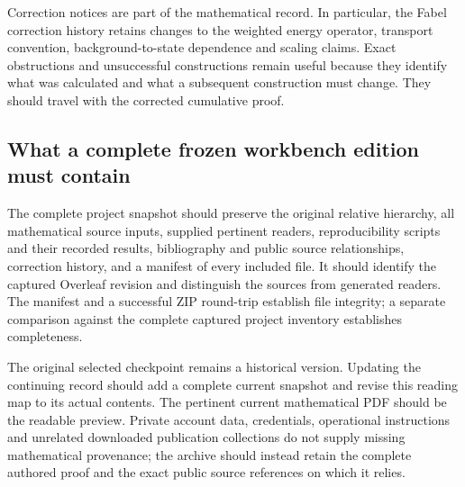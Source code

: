Correction notices are part of the mathematical record. In particular,
the Fabel correction history retains changes to the weighted energy
operator, transport convention, background-to-state dependence and
scaling claims. Exact obstructions and unsuccessful constructions remain
useful because they identify what was calculated and what a subsequent
construction must change. They should travel with the corrected
cumulative proof.

\subsection{What a complete frozen workbench edition must
contain}\label{full-workbench-reading-map-md-what-a-complete-frozen-workbench-edition-must-contain}

The complete project snapshot should preserve the original relative
hierarchy, all mathematical source inputs, supplied pertinent readers,
reproducibility scripts and their recorded results, bibliography and
public source relationships, correction history, and a manifest of every
included file. It should identify the captured Overleaf revision and
distinguish the sources from generated readers. The manifest and a
successful ZIP round-trip establish file integrity; a separate
comparison against the complete captured project inventory establishes
completeness.

The original selected checkpoint remains a historical version. Updating
the continuing record should add a complete current snapshot and revise
this reading map to its actual contents. The pertinent current
mathematical PDF should be the readable preview. Private account data,
credentials, operational instructions and unrelated downloaded
publication collections do not supply missing mathematical provenance;
the archive should instead retain the complete authored proof and the
exact public source references on which it relies.
